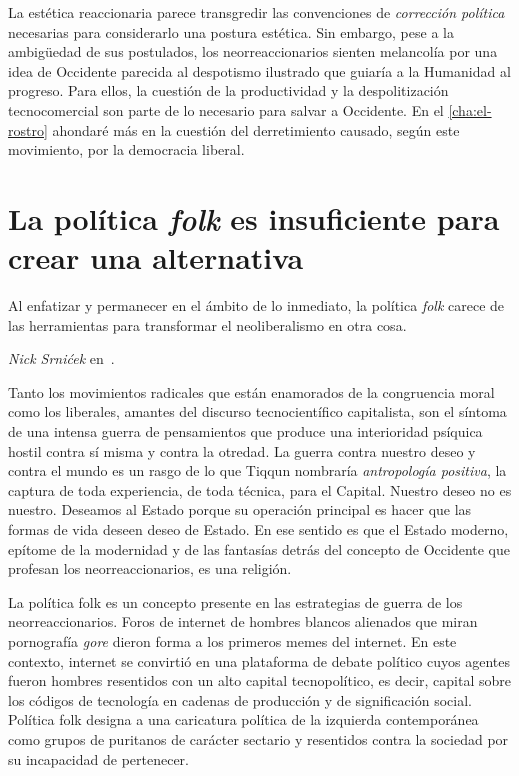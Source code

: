 La estética reaccionaria parece transgredir las convenciones de \emph{corrección política} necesarias para considerarlo una postura estética. Sin embargo, pese a la ambigüedad de sus postulados, los neorreaccionarios sienten melancolía por una idea de Occidente parecida al despotismo ilustrado que guiaría a la Humanidad al progreso. Para ellos, la cuestión de la productividad y la despolitización tecnocomercial son parte de lo necesario para salvar a Occidente. En el \ref{cha:el-rostro} ahondaré más en la cuestión del derretimiento causado, según este movimiento, por la democracia liberal.

\section{La política \emph{folk} es insuficiente para crear una alternativa}
\label{sec:la-política-folk}

\epigraph{Al enfatizar y permanecer en el ámbito de lo inmediato, la política \emph{folk} carece de las herramientas para transformar el neoliberalismo en otra cosa.}{\emph{Nick Srnićek} en~\autocite{srnicekInventarFuturoPoscapitalismo2017}.}

Tanto los movimientos radicales que están enamorados de la congruencia moral como los liberales, amantes del discurso tecnocientífico capitalista, son el síntoma de una intensa guerra de pensamientos que produce una interioridad psíquica hostil contra sí misma y contra la otredad. La guerra contra nuestro deseo y contra el mundo es un rasgo de lo que Tiqqun nombraría \emph{antropología positiva}, la captura de toda experiencia, de toda técnica, para el Capital. Nuestro deseo no es nuestro. Deseamos al Estado porque su operación principal es hacer que las formas de vida deseen deseo de Estado. En ese sentido es que el Estado moderno, epítome de la modernidad y de las fantasías detrás del concepto de Occidente que profesan los neorreaccionarios, es una religión.

La política folk es un concepto presente en las estrategias de guerra de los neorreaccionarios. Foros de internet de hombres blancos alienados que miran pornografía \emph{gore} dieron forma a los primeros memes del internet. En este contexto, internet se convirtió en una plataforma de debate político cuyos agentes fueron hombres resentidos con un alto capital tecnopolítico, es decir, capital sobre los códigos de tecnología en cadenas de producción y de significación social. Política folk designa a una caricatura política de la izquierda contemporánea como grupos de puritanos de carácter sectario y resentidos contra la sociedad por su incapacidad de pertenecer.

